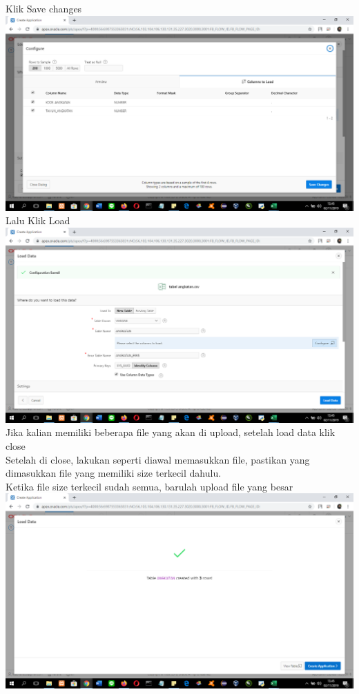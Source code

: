 \begin{enumerate}
Klik Save changes\\
\includegraphics[scale= 0.3]{gambar/gambar11.png}\\
Lalu Klik Load\\
\includegraphics[scale= 0.3]{gambar/gambar12.png}\\
Jika kalian memiliki beberapa file yang akan di upload, setelah load data klik close\\
Setelah di close, lakukan seperti diawal memasukkan file, pastikan yang dimasukkan file yang memiliki size terkecil dahulu.\\
Ketika file size terkecil sudah semua, barulah upload file yang besar\\
\includegraphics[scale= 0.3]{gambar/gambar13.png}\\


\end{enumerate}
